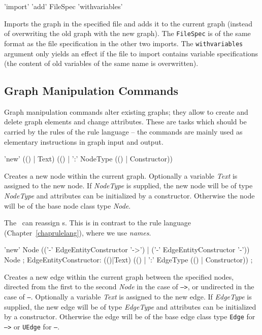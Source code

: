 \begin{rail}
  'import' 'add' FileSpec 'withvariables'
\end{rail}
Imports the graph in the specified file and adds it to the current graph
(instead of overwriting the old graph with the new graph).
The \texttt{FileSpec} is of the same format as the file specification in the other two imports.
The \texttt{withvariables} argument only yields an effect if the file to import contains variable specifications (the content of old variables of the same name is overwritten).


\subsection{Graph Manipulation Commands}
\label{mani}
Graph manipulation commands alter existing graphs; they allow to create and delete graph elements and change attributes. 
These are tasks which should be carried by the rules of the rule language -- the commands are mainly used as elementary instructions in graph input and output.

\begin{rail}
  'new' (() | Text) (() | ':' NodeType (() | Constructor))
\end{rail}
Creates a new node within the current graph.
Optionally a variable \emph{Text} is assigned to the new node.
If \emph{NodeType} is supplied, the new node will be of type \emph{NodeType} and attributes can be initialized by a constructor.
Otherwise the node will be of the base node class type \emph{Node}.
\begin{note}
The \GrShell\ can reassign s. 
This is in contrast to the rule language (Chapter~\ref{chaprulelang}), where we use \emph{names}.
\end{note}

\begin{rail}
  'new' Node (('-' EdgeEntityConstructor '->') | ('-' EdgeEntityConstructor '-')) Node ;
EdgeEntityConstructor:
  (()|Text) (() | ':' EdgeType (() | Constructor)) ;
\end{rail}
Creates a new edge within the current graph between the specified nodes,
directed from the first to the second \emph{Node} in the case of \texttt{-->},
or undirected in the case of \texttt{--}.
Optionally a variable \emph{Text} is assigned to the new edge.
If \emph{EdgeType} is supplied, the new edge will be of type \emph{EdgeType} and attributes can be initialized by a constructor.
Otherwise the edge will be of the base edge class type \texttt{Edge} for \texttt{-->} or \texttt{UEdge} for \texttt{--}.

